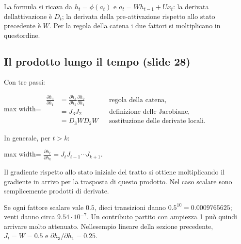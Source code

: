 \documentclass[11pt,a4paper,oneside,openany]{book}
\begin{document}
La formula si ricava da \(h_t=\phi(a_t)\) e \(a_t=Wh_{t-1}+Ux_t\): la derivata dell\textquotesingle attivazione è \(D_t\); la derivata della pre-attivazione rispetto allo stato precedente è \(W\). Per la regola della catena i due fattori si moltiplicano in quest\textquotesingle ordine.

\subsection{Il prodotto lungo il tempo (slide 28)}\label{f03-r557}

Con tre passi:

\begin{center}
\begin{adjustbox}{max width=\linewidth}
$\displaystyle 
\begin{aligned}
\frac{\partial h_3}{\partial h_1}
&=\frac{\partial h_3}{\partial h_2}\frac{\partial h_2}{\partial h_1}
&&\text{regola della catena},\\
&=J_3J_2
&&\text{definizione delle Jacobiane},\\
&=D_3WD_2W
&&\text{sostituzione delle derivate locali}.
\end{aligned}
$
\end{adjustbox}
\end{center}

In generale, per \(t>k\):

\begin{center}
\begin{adjustbox}{max width=\linewidth}
$\displaystyle \boxed{\frac{\partial h_t}{\partial h_k}=J_tJ_{t-1}\cdots J_{k+1}.}$
\end{adjustbox}
\end{center}

Il gradiente rispetto allo stato iniziale del tratto si ottiene moltiplicando il gradiente in arrivo per la trasposta di questo prodotto. Nel caso scalare sono semplicemente prodotti di derivate.

Se ogni fattore scalare vale \(0.5\), dieci transizioni danno \(0.5^{10}=0.0009765625\); venti danno circa \(9.54\cdot10^{-7}\). Un contributo partito con ampiezza 1 può quindi arrivare molto attenuato. Nell\textquotesingle esempio lineare della sezione precedente, \(J_t=W=0.5\) e \(\partial h_3/\partial h_1=0.25\).
\end{document}
